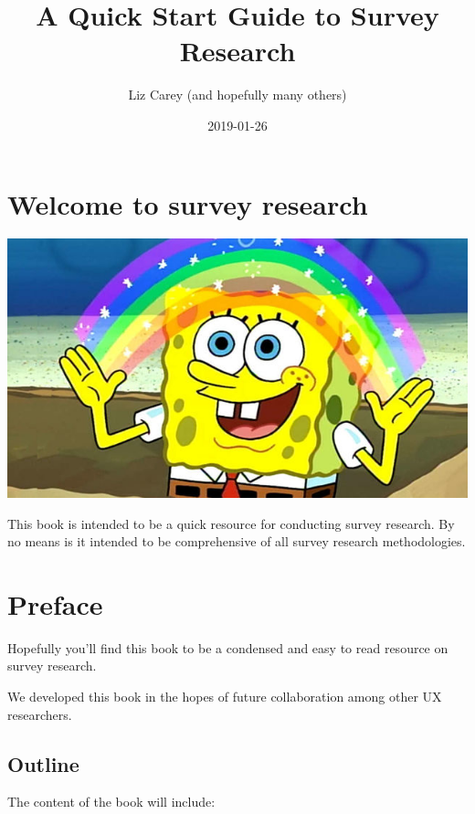 \documentclass[]{book}
\title{A Quick Start Guide to Survey Research}
\author{Liz Carey (and hopefully many others)}
\date{2019-01-26}
\begin{document}
\maketitle

{
\hypersetup{linkcolor=black}
\setcounter{tocdepth}{1}
\tableofcontents
}
\hypertarget{welcome-to-survey-research}{%
\chapter*{Welcome to survey research}\label{welcome-to-survey-research}}

\includegraphics{figs/sponge_bob.png}

This book is intended to be a quick resource for conducting survey research. By no means is it intended to be comprehensive of all survey research methodologies.

\hypertarget{preface}{%
\chapter*{Preface}\label{preface}}

Hopefully you'll find this book to be a condensed and easy to read resource on survey research.

We developed this book in the hopes of future collaboration among other UX researchers.

\hypertarget{outline}{%
\section*{Outline}\label{outline}}

The content of the book will include:
\end{document}
